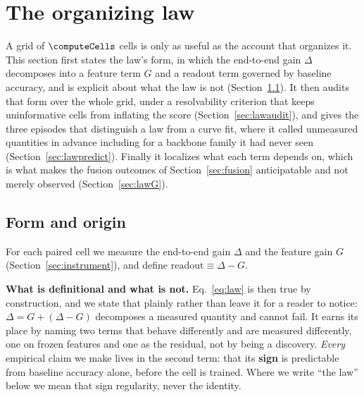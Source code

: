 \section{The organizing law}\label{sec:law}

A grid of $\computeCells$ cells is only as useful as the account that organizes
it. This section first states the law's form, in which the end-to-end gain $\Delta$
decomposes into a feature term $G$ and a readout term governed by baseline
accuracy, and is explicit about what the law is not
(Section~\ref{sec:lawform}). It then audits that form over the whole grid,
under a resolvability criterion that keeps uninformative cells from inflating
the score (Section~\ref{sec:lawaudit}), and gives the three episodes that
distinguish a law from a curve fit, where it called unmeasured quantities in
advance including for a backbone family it had never seen
(Section~\ref{sec:lawpredict}). Finally it localizes what each term depends on,
which is what makes the fusion outcomes of Section~\ref{sec:fusion}
anticipatable and not merely observed (Section~\ref{sec:lawG}).

\subsection{Form and origin}\label{sec:lawform}
For each paired cell we measure the end-to-end gain $\Delta$ and the
feature gain $G$ (Section~\ref{sec:instrument}), and define
$\mathrm{readout} \equiv \Delta - G$.

\textbf{What is definitional and what is not.} Eq.~\ref{eq:law} is then true by
construction, and we state that plainly rather than leave it for a reader to
notice: $\Delta = G + (\Delta - G)$ decomposes a measured quantity and cannot
fail. It earns its place by naming two terms that behave differently and are
measured differently, one on frozen features and one as the residual, not by
being a discovery. \emph{Every} empirical claim we make lives in the second
term: that its \textbf{sign} is predictable from baseline accuracy alone, before
the cell is trained. Where we write ``the law'' below we mean that sign
regularity, never the identity.

